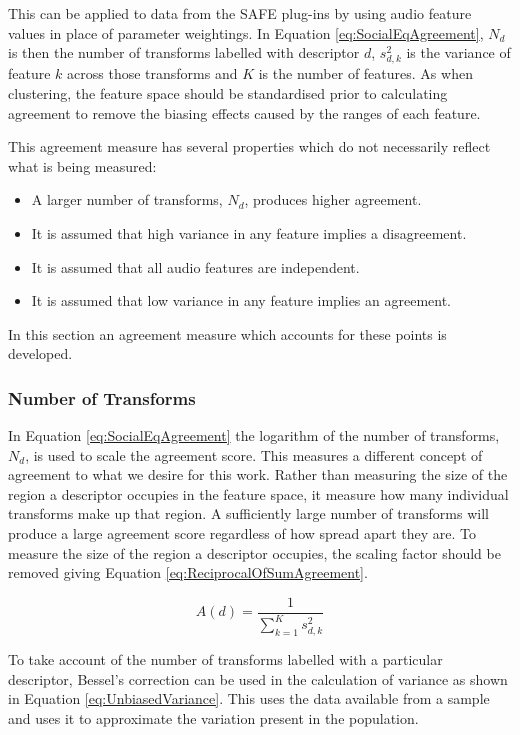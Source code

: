		This can be applied to data from the SAFE plug-ins by using audio feature values in place of parameter
		weightings. In Equation \ref{eq:SocialEqAgreement}, $N_{d}$ is then the number of transforms labelled with
		descriptor $d$, $s_{d,k}^{2}$ is the variance of feature $k$ across those transforms and $K$ is the
		number of features. As when clustering, the feature space should be standardised prior to calculating
		agreement to remove the biasing effects caused by the ranges of each feature.

		This agreement measure has several properties which do not necessarily reflect what is being measured:

		\begin{itemize}
			\item A larger number of transforms, $N_{d}$, produces higher agreement.
			\item It is assumed that high variance in any feature implies a disagreement. 
			\item It is assumed that all audio features are independent. 
			\item It is assumed that low variance in any feature implies an agreement. 
		\end{itemize}

		In this section an agreement measure which accounts for these points is developed.

		\subsubsection*{Number of Transforms}
			In Equation \ref{eq:SocialEqAgreement} the logarithm of the number of transforms, $N_{d}$, is used
			to scale the agreement score. This measures a different concept of agreement to what we desire for
			this work. Rather than measuring the size of the region a descriptor occupies in the feature space,
			it measure how many individual transforms make up that region. A sufficiently large number of
			transforms will produce a large agreement score regardless of how spread apart they are. To measure
			the size of the region a descriptor occupies, the scaling factor should be removed giving Equation
			\ref{eq:ReciprocalOfSumAgreement}.

			\begin{equation}
				A(d) = \frac{1}{\sum_{k = 1}^{K} s_{d,k}^{2}}
				\label{eq:ReciprocalOfSumAgreement}
			\end{equation}

			To take account of the number of transforms labelled with a particular descriptor, Bessel's
			correction can be used in the calculation of variance as shown in Equation
			\ref{eq:UnbiasedVariance}. This uses the data available from a sample and uses it to approximate
			the variation present in the population.

